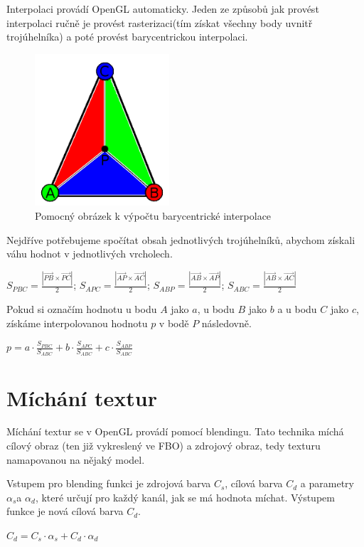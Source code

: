 \documentclass[11pt,twoside,a4paper]{book}
\begin{document}
Interpolaci provádí OpenGL automaticky. Jeden ze způsobů jak provést interpolaci ručně je provést rasterizaci(tím získat všechny body uvnitř trojúhelníka) a poté provést barycentrickou interpolaci.

\begin{center}
\begin{figure}[h]
\includegraphics[width=50mm]{figures/interpolation.png}
\caption{Pomocný obrázek k výpočtu barycentrické interpolace}
\end{figure}
\end{center}

Nejdříve potřebujeme spočítat obsah jednotlivých trojúhelníků, abychom získali váhu hodnot v jednotlivých vrcholech.
\begin{center} 
$S_{PBC} = \frac{|\vec{PB} \times \vec{PC}|}{2}$;
$S_{APC} = \frac{|\vec{AP} \times \vec{AC}|}{2}$; 
$S_{ABP} = \frac{|\vec{AB} \times \vec{AP}|}{2}$;
$S_{ABC} = \frac{|\vec{AB} \times \vec{AC}|}{2}$
\end{center}

Pokud si označím hodnotu u bodu $A$ jako $a$, u bodu $B$ jako $b$ a u bodu $C$ jako $c$, získáme interpolovanou hodnotu $p$ v bodě $P$ následovně.
\begin{center}
$p = a \cdot \frac{S_{PBC}}{S_{ABC}} + b \cdot \frac{S_{APC}}{S_{ABC}} + c \cdot \frac{S_{ABP}}{S_{ABC}}$
\end{center}

\section{Míchání textur}

Míchání textur se v OpenGL provádí pomocí blendingu. Tato technika míchá cílový obraz (ten již vykreslený ve FBO) a zdrojový obraz, tedy texturu namapovanou na nějaký model.

Vstupem pro blending funkci je zdrojová barva $C_s$, cílová barva $C_d$ a parametry $\alpha_s$\linebreak a $\alpha_d$, které určují pro každý kanál, jak se má hodnota míchat. Výstupem funkce je nová cílová barva $C_d$.
\begin{center}
$C_d = C_s \cdot \alpha_s + C_d \cdot \alpha_d$
\end{center}
\end{document}
